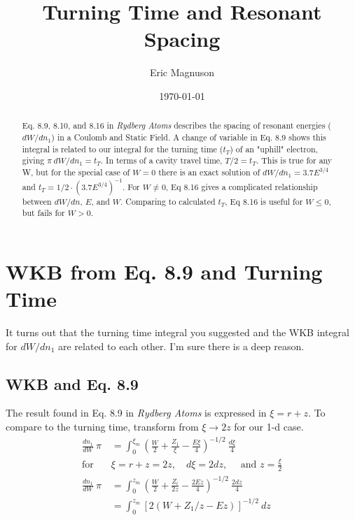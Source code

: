 \documentclass[aps,pra,preprint,groupedaddress]{revtex4-1}
\begin{document}
\title{Turning Time and Resonant Spacing}

\author{Eric Magnuson}
\date{\today}

\begin{abstract}
Eq. 8.9, 8.10, and 8.16 in \emph{Rydberg Atoms} describes the spacing of resonant energies ($dW/dn_1$) in a Coulomb and Static Field. A change of variable in Eq. 8.9 shows this integral is related to our integral for the turning time ($t_T$) of an "uphill" electron, giving $\pi ~ dW/dn_1 = t_T$. In terms of a cavity travel time, $T/2 = t_T$. This is true for any W, but for the special case of $W = 0$ there is an exact solution of $dW/dn_1 = 3.7 E^{3/4}$ and $t_T = 1/2 \cdot (3.7 E^{3/4})^{-1}$. For $W \neq 0$, Eq 8.16 gives a complicated relationship between $dW/dn$, $E$, and $W$. Comparing to calculated $t_T$, Eq 8.16 is useful for $W \leq 0$, but fails for $W > 0$.
\end{abstract}

\maketitle

\section{\label{sec:WKBtt} WKB from Eq. 8.9 and Turning Time}

It turns out that the turning time integral you suggested and the WKB integral for $dW/dn_1$ are related to each other. I'm sure there is a deep reason.

\subsection{\label{sec:WKB} WKB and Eq. 8.9 }

The result found in Eq. 8.9 in \emph{Rydberg Atoms} is expressed in $\xi = r + z$. To compare to the turning time, transform from $\xi \rightarrow 2z$ for our 1-d case.
\begin{align*}
\frac{dn_1}{dW} ~ \pi & = \int_0^{\xi_m} \left( \frac{W}{2} + \frac{Z_1}{\xi} - \frac{E\xi}{4} \right)^{-1/2} ~ \frac{d\xi}{4} \\
\text{for} \quad & \xi = r + z = 2z , \quad d\xi = 2 dz , \quad \text{ and } z = \frac{\xi}{2} \\
\frac{dn_1}{dW} ~ \pi & = \int_0^{z_m} \left( \frac{W}{2} + \frac{Z_i}{2z} - \frac{2Ez}{4} \right)^{-1/2} ~ \frac{2 dz}{4} \\
 & = \int_0^{z_m} [2(W + Z_1 / z - Ez)]^{-1/2} ~ dz
\end{align*}
\end{document}
